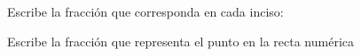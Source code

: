 \documentclass[12pt,addpoints]{evalua}
\begin{document}
\begin{questions}

    \question[4] Escribe la fracción que corresponda en cada inciso:
  


    \question[4] Escribe la fracción que representa el punto en la recta numérica
   
    \begin{multicols}{2}
        \begin{parts}

\end{parts}
\end{multicols}
\end{questions}
\end{document}
